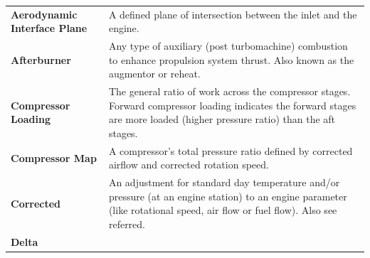 \documentclass[
]{book}
\begin{document}
\begin{longtable}[]{@{}ll@{}}
\toprule
\endhead
\begin{minipage}[t]{0.24\columnwidth}\raggedright
\textbf{Aerodynamic Interface Plane}\strut
\end{minipage} & \begin{minipage}[t]{0.71\columnwidth}\raggedright
A defined plane of intersection between the inlet and the engine.\strut
\end{minipage}\tabularnewline
\begin{minipage}[t]{0.24\columnwidth}\raggedright
\textbf{Afterburner}\strut
\end{minipage} & \begin{minipage}[t]{0.71\columnwidth}\raggedright
Any type of auxiliary (post turbomachine) combustion to enhance propulsion system thrust. Also known as the augmentor or reheat.\strut
\end{minipage}\tabularnewline
\begin{minipage}[t]{0.24\columnwidth}\raggedright
\textbf{Compressor Loading}\strut
\end{minipage} & \begin{minipage}[t]{0.71\columnwidth}\raggedright
The general ratio of work across the compressor stages. Forward compressor loading indicates the forward stages are more loaded (higher pressure ratio) than the aft stages.\strut
\end{minipage}\tabularnewline
\begin{minipage}[t]{0.24\columnwidth}\raggedright
\textbf{Compressor Map}\strut
\end{minipage} & \begin{minipage}[t]{0.71\columnwidth}\raggedright
A compressor's total pressure ratio defined by corrected airflow and corrected rotation speed.\strut
\end{minipage}\tabularnewline
\begin{minipage}[t]{0.24\columnwidth}\raggedright
\textbf{Corrected}\strut
\end{minipage} & \begin{minipage}[t]{0.71\columnwidth}\raggedright
An adjustment for standard day temperature and/or pressure (at an engine station) to an engine parameter (like rotational speed, air flow or fuel flow). Also see referred.\strut
\end{minipage}\tabularnewline
\begin{minipage}[t]{0.24\columnwidth}\raggedright
\textbf{Delta}\strut
\end{minipage} & \begin{minipage}[t]{0.71\columnwidth}\raggedright

\end{minipage}
\end{longtable}
\end{document}
